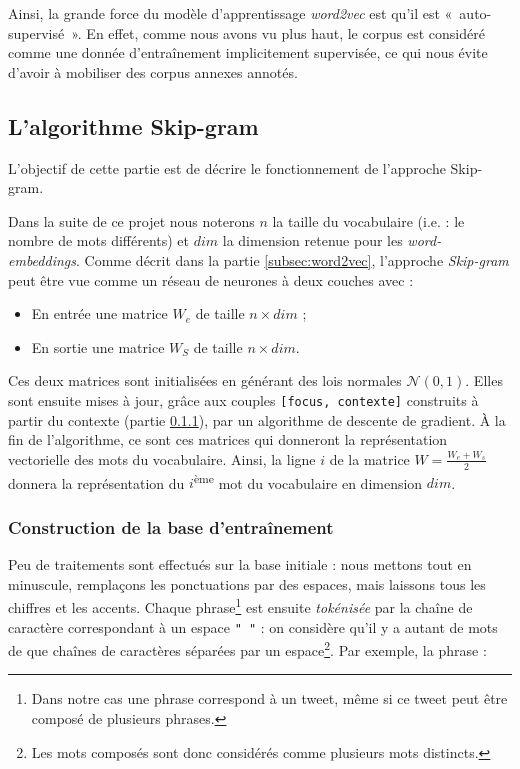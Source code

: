 \documentclass[11pt,french,french]{article}
\let\rmarkdownfootnote\footnote%
\def\footnote{\protect\rmarkdownfootnote}
\begin{document}
Ainsi, la grande force du modèle d'apprentissage \emph{word2vec} est
qu'il est «~auto-supervisé~». En effet, comme nous avons vu plus haut,
le corpus est considéré comme une donnée d'entraînement implicitement
supervisée, ce qui nous évite d'avoir à mobiliser des corpus annexes
annotés.

\subsection{L'algorithme Skip-gram}\label{sec:skipgram}

L'objectif de cette partie est de décrire le fonctionnement de
l'approche Skip-gram.

Dans la suite de ce projet nous noterons \(n\) la taille du vocabulaire
(i.e. : le nombre de mots différents) et \(dim\) la dimension retenue
pour les \emph{word-embeddings}. Comme décrit dans la partie
\ref{subsec:word2vec}, l'approche \emph{Skip-gram} peut être vue comme
un réseau de neurones à deux couches avec :

\begin{itemize}
\item
  En entrée une matrice \(W_e\) de taille \(n\times dim\) ;
\item
  En sortie une matrice \(W_S\) de taille \(n\times dim\).
\end{itemize}

Ces deux matrices sont initialisées en générant des lois normales
\(\mathcal N(0,1)\). Elles sont ensuite mises à jour, grâce aux couples
\texttt{{[}focus,\ contexte{]}} construits à partir du contexte (partie
\ref{subsec:baseentrainement}), par un algorithme de descente de
gradient. À la fin de l'algorithme, ce sont ces matrices qui donneront
la représentation vectorielle des mots du vocabulaire. Ainsi, la ligne
\(i\) de la matrice \(W=\frac{W_e+W_s}{2}\) donnera la représentation du
\(i\)\textsuperscript{ème} mot du vocabulaire en dimension \(dim\).

\subsubsection{Construction de la base
d'entraînement}\label{subsec:baseentrainement}

Peu de traitements sont effectués sur la base initiale : nous mettons
tout en minuscule, remplaçons les ponctuations par des espaces, mais
laissons tous les chiffres et les accents. Chaque phrase\footnote{Dans
  notre cas une phrase correspond à un tweet, même si ce tweet peut être
  composé de plusieurs phrases.} est ensuite \emph{tokénisée} par la
chaîne de caractère correspondant à un espace \texttt{"\ "} : on
considère qu'il y a autant de mots de que chaînes de caractères séparées
par un espace\footnote{Les mots composés sont donc considérés comme
  plusieurs mots distincts.}. Par exemple, la phrase :
\end{document}
